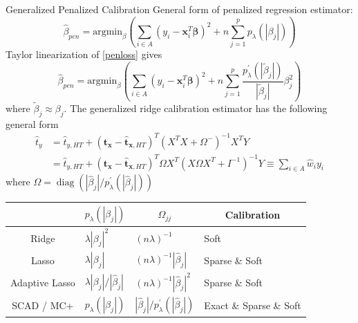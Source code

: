 \documentclass[final]{beamer}
\newlength{\colwidth}
\renewcommand{\bf}[1]{\boldsymbol{\mathbf{#1}}}
\newcommand{\pa}[1]{\left(#1\right)} %
\newcommand{\abs}[1]{\left|#1\right|} %
\DeclareMathOperator{\diag}{diag}
\begin{document}
\begin{frame}[t]
\begin{columns}[t]
\begin{column}{\colwidth}
  \begin{alertblock}{Generalized Penalized Calibration}
    General form of penalized regression estimator:
        \begin{equation}
            \hat \beta_{pen} = \mathrm{argmin}_{\beta} \pa{\sum_{i \in A} (y_i - \bf x_i^T \bf \beta)^2 + n \sum_{j = 1}^p p_\lambda(\abs{\beta_j})} \label{penloss}
        \end{equation}
    Taylor linearization of \eqref{penloss} gives
        \begin{equation}
            \hat \beta_{pen} = \mathrm{argmin}_{\beta} \pa{\sum_{i \in A} (y_i - \bf x_i^T \bf \beta)^2 + n \sum_{j = 1}^p \frac{p_\lambda^\prime(\abs{\tilde \beta_j})}{\abs{\tilde \beta_j}}\beta_j^2}
        \end{equation}
    where $\tilde \beta_j \approx \beta_j$.
    The generalized ridge calibration estimator has the following general form
    \begin{align}
    \hat t_{y} &= \hat t_{y, HT} + (\bf t_{\bf x} - \hat {\bf t}_{\bf x, HT})^T(X^TX + \Omega^{-})^{-1}X^TY \\
    &= \hat t_{y, HT} + (\bf t_{\bf x} - \hat {\bf t}_{\bf x, HT})^T\Omega X^T (X\Omega X^T + I^{-1})^{-1} Y \equiv \sum_{i \in A} \hat w_i y_i
    \end{align}
    where $\Omega = \diag\pa{\abs{\hat \beta_j} \bigg / p^\prime_\lambda\pa{\abs{\hat \beta_j}}}$
    \renewcommand{\arraystretch}{1.5}
    
\begin{table}[H]
\begin{tabular}{clll}
\hline
               & \multicolumn{1}{c}{$p_\lambda\pa{\abs{\beta_j}}$} & \multicolumn{1}{c}{$\Omega_{jj}$}     & \multicolumn{1}{c}{Calibration} \\ \hline
Ridge          & $\lambda\abs{\beta_j}^2$                          & $(n\lambda)^{-1}$                     & Soft                            \\
Lasso          & $\lambda\abs{\beta_j}$                            & $(n\lambda)^{-1}\abs{\hat \beta_j}$   & Sparse \& Soft                  \\
Adaptive Lasso & $\lambda{\abs{\beta_j}} / {\abs{\hat \beta_j}}$   & $(n\lambda)^{-1}\abs{\hat \beta_j}^2$ & Sparse \& Soft                  \\
SCAD / MC+ & $p_\lambda\pa{\abs{\beta_j}}$ & $\abs{\hat \beta_j} / p^\prime_\lambda\pa{\abs{\hat \beta_j}}$ & Exact \& Sparse \& Soft \\ \hline
\end{tabular}
\label{tab:my-table}
\end{table}


\end{alertblock}
\end{column}
\end{columns}
\end{frame}
\end{document}
